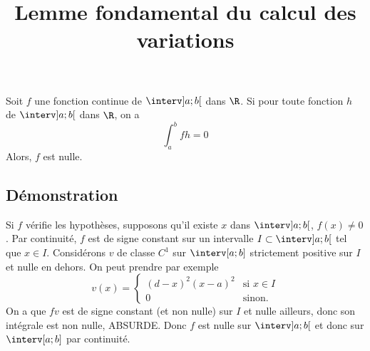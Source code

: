 \documentclass[fontsize=12pt,twoside=false,parskip=half]{scrartcl}
\title{Lemme fondamental du calcul des variations}
\date{}
\author{}
\begin{document}
\maketitle
   \begin{Theoreme}[]
      Soit $f$ une fonction continue de $\interv]a; b[$ dans $\R$. Si pour toute fonction
      $h$ de $\interv]a; b[$ dans $\R$, on a
      \[
         \int_a^b fh = 0
      \]
      Alors, $f$ est nulle.
   \end{Theoreme}
   \subsection{Démonstration}
      Si $f$ vérifie les hypothèses, supposons qu’il existe $x$ dans $\interv]a; b[$, 
      $f(x) \neq 0$. Par continuité, $f$ est de signe constant sur un intervalle $I \subset \interv]a; b[$ tel que $x \in I$. Considérons $v$ de classe $C^1$ sur 
      $\interv[a; b]$ strictement positive sur $I$ et nulle en dehors. On peut prendre 
      par exemple
      \[
         v(x) = \begin{cases}
            (d - x)^2(x - a)^2 & \text{si } x \in I\\
            0                  & \text{sinon}.
         \end{cases}
      \]
      On a que $fv$ est de signe constant (et non nulle) sur $I$ et nulle ailleurs, donc 
      son intégrale est non nulle, ABSURDE. Donc $f$ est nulle sur $\interv]a; b[$ et donc
      sur $\interv[a; b]$ par continuité.
\end{document}
